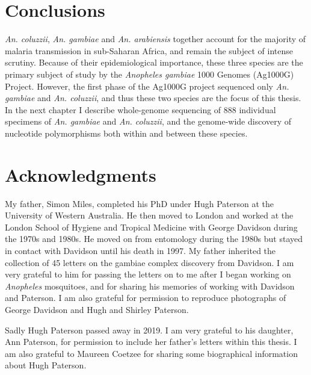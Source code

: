 \documentclass[a4paper,11pt,abstracton,hidelinks]{scrartcl}
\begin{document}
\section{Conclusions}\label{sec:conclusions}


%
\textit{An. coluzzii}, \textit{An. gambiae} and \textit{An. arabiensis} together account for the majority of malaria transmission in sub-Saharan Africa, and remain the subject of intense scrutiny.
%
Because of their epidemiological importance, these three species are the primary subject of study by the \textit{Anopheles gambiae} 1000 Genomes (Ag1000G) Project.
%
However, the first phase of the Ag1000G project sequenced only \textit{An. gambiae} and \textit{An. coluzzii}, and thus these two species are the focus of this thesis.
%
In the next chapter I describe whole-genome sequencing of 888 individual specimens of \textit{An. gambiae} and \textit{An. coluzzii}, and the genome-wide discovery of nucleotide polymorphisms both within and between these species. 


\section{Acknowledgments}\label{sec:acknowledgments}


My father, Simon Miles, completed his PhD under Hugh Paterson at the University of Western Australia. 
%
He then moved to London and worked at the London School of Hygiene and Tropical Medicine with George Davidson during the 1970s and 1980s. 
%
He moved on from entomology during the 1980s but stayed in contact with Davidson until his death in 1997.
%
My father inherited the collection of 45 letters on the gambiae complex discovery from Davidson. 
%
I am very grateful to him for passing the letters on to me after I began working on \textit{Anopheles} mosquitoes, and for sharing his memories of working with Davidson and Paterson.
%
I am also grateful for permission to reproduce photographs of George Davidson and Hugh and Shirley Paterson.


Sadly Hugh Paterson passed away in 2019.
%
I am very grateful to his daughter, Ann Paterson, for permission to include her father's letters within this thesis.
%
I am also grateful to Maureen Coetzee for sharing some biographical information about Hugh Paterson.
%


\printbibliography
\end{document}
